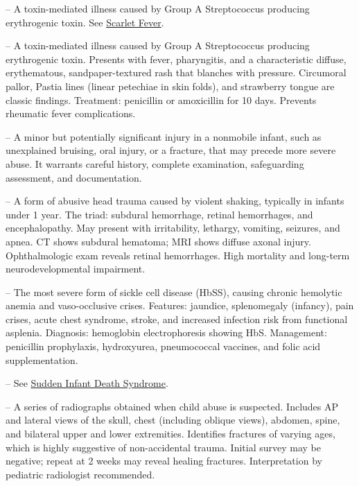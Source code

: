 -- A toxin-mediated illness caused by Group A Streptococcus producing erythrogenic toxin. See \hyperlink{Scarlet Fever}{Scarlet Fever}.

-- A toxin-mediated illness caused by Group A Streptococcus producing erythrogenic toxin. Presents with fever, pharyngitis, and a characteristic diffuse, erythematous, sandpaper-textured rash that blanches with pressure. Circumoral pallor, Pastia lines (linear petechiae in skin folds), and strawberry tongue are classic findings. Treatment: penicillin or amoxicillin for 10 days. Prevents rheumatic fever complications.

-- A minor but potentially significant injury in a nonmobile infant, such as unexplained bruising, oral injury, or a fracture, that may precede more severe abuse. It warrants careful history, complete examination, safeguarding assessment, and documentation.

-- A form of abusive head trauma caused by violent shaking, typically in infants under 1 year. The triad: subdural hemorrhage, retinal hemorrhages, and encephalopathy. May present with irritability, lethargy, vomiting, seizures, and apnea. CT shows subdural hematoma; MRI shows diffuse axonal injury. Ophthalmologic exam reveals retinal hemorrhages. High mortality and long-term neurodevelopmental impairment.

-- The most severe form of sickle cell disease (HbSS), causing chronic hemolytic anemia and vaso-occlusive crises. Features: jaundice, splenomegaly (infancy), pain crises, acute chest syndrome, stroke, and increased infection risk from functional asplenia. Diagnosis: hemoglobin electrophoresis showing HbS. Management: penicillin prophylaxis, hydroxyurea, pneumococcal vaccines, and folic acid supplementation.

-- See \hyperlink{Sudden Infant Death Syndrome}{Sudden Infant Death Syndrome}.

-- A series of radiographs obtained when child abuse is suspected. Includes AP and lateral views of the skull, chest (including oblique views), abdomen, spine, and bilateral upper and lower extremities. Identifies fractures of varying ages, which is highly suggestive of non-accidental trauma. Initial survey may be negative; repeat at 2 weeks may reveal healing fractures. Interpretation by pediatric radiologist recommended.

